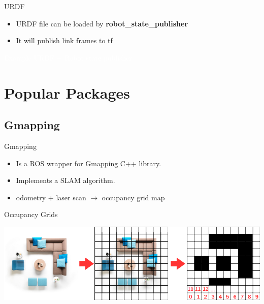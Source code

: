 \documentclass{beamer}
\begin{document}
\begin{frame}{URDF} 
	\begin{itemize}
		\item URDF file can be loaded by \textbf{robot\_state\_publisher}
		\vspace{0.5cm}
		\item It will publish link frames to tf
	\end{itemize}
\end{frame}

\begin{frame}[plain]{}  
	\centering
	{\huge \textcolor{white}{Example} }
	\linebreak
	{\textcolor{white}{URDF + Robot state publisher} }
\end{frame}


\section{Popular Packages}
\subsection{Gmapping}
\begin{frame}{Gmapping} 
	\begin{itemize}
		\item Is a ROS wrapper for Gmapping C++ library.
		\vspace{0.5cm}
		\item Implements a SLAM algorithm.
		\vspace{0.5cm}
		\item odometry + laser scan $\rightarrow$ occupancy grid map 
	\end{itemize}
\end{frame}

\begin{frame}{Occupancy Grids} 
	\subtitle{Gmapping}
	\centering
	\includegraphics[width=.99\linewidth]{figures/occupancy_grid.png} 
	\vspace{0.5cm}
	\begin{focus}
	\end{focus}
\end{frame}
\end{document}
